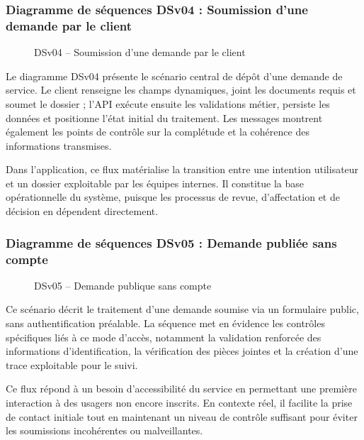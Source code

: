 \newpage
\subsubsection{Diagramme de séquences DSv04 : Soumission d'une demande par le client}

\begin{figure}[H]
  \centering
  
  \caption{DSv04 -- Soumission d'une demande par le client}
  \label{fig:dseq_dsv04}
\end{figure}

Le diagramme DSv04 présente le scénario central de dépôt d'une demande de service. Le client renseigne les champs dynamiques, joint les documents requis et soumet le dossier ; l'API exécute ensuite les validations métier, persiste les données et positionne l'état initial du traitement. Les messages montrent également les points de contrôle sur la complétude et la cohérence des informations transmises.

Dans l'application, ce flux matérialise la transition entre une intention utilisateur et un dossier exploitable par les équipes internes. Il constitue la base opérationnelle du système, puisque les processus de revue, d'affectation et de décision en dépendent directement.

\newpage
\subsubsection{Diagramme de séquences DSv05 : Demande publiée sans compte}

\begin{figure}[H]
  \centering
  
  \caption{DSv05 -- Demande publique sans compte}
  \label{fig:dseq_dsv05}
\end{figure}

Ce scénario décrit le traitement d'une demande soumise via un formulaire public, sans authentification préalable. La séquence met en évidence les contrôles spécifiques liés à ce mode d'accès, notamment la validation renforcée des informations d'identification, la vérification des pièces jointes et la création d'une trace exploitable pour le suivi.

Ce flux répond à un besoin d'accessibilité du service en permettant une première interaction à des usagers non encore inscrits. En contexte réel, il facilite la prise de contact initiale tout en maintenant un niveau de contrôle suffisant pour éviter les soumissions incohérentes ou malveillantes.

